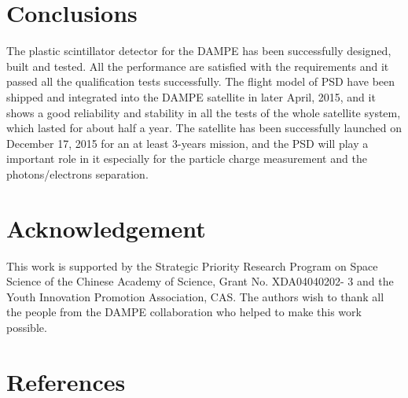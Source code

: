 \documentclass[preprint]{elsarticle}
\begin{document}
\section{Conclusions}

The plastic scintillator detector for the DAMPE has been successfully designed, built and tested. All the performance are satisfied with the requirements and it passed all the qualification tests successfully.
The flight model of PSD have been shipped and integrated into the DAMPE satellite in later April, 2015, and it shows a good reliability and stability in all the tests of the whole satellite system, which lasted for about half a year. The satellite has been successfully launched on December 17, 2015 for an at least 3-years mission, and the PSD will play a important role in it especially for the particle charge measurement and the photons/electrons separation.

\section*{Acknowledgement}

This work is supported by the Strategic Priority Research Program on Space Science of the Chinese Academy of Science, Grant No. XDA04040202- 3 and the Youth Innovation Promotion Association, CAS. The authors wish to thank all the people from the DAMPE collaboration who helped to make this work possible.



\section*{References}
\end{document}
